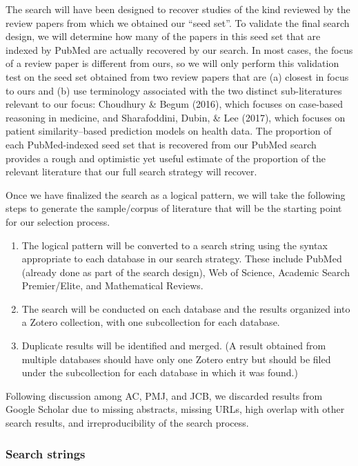 \documentclass[preprint, 3p,
authoryear]{elsarticle} %
\providecommand{\tightlist}{%
  \setlength{\itemsep}{0pt}\setlength{\parskip}{0pt}}
\begin{document}
The search will have been designed to recover studies of the kind
reviewed by the review papers from which we obtained our ``seed set''.
To validate the final search design, we will determine how many of the
papers in this seed set that are indexed by PubMed are actually
recovered by our search. In most cases, the focus of a review paper is
different from ours, so we will only perform this validation test on the
seed set obtained from two review papers that are (a) closest in focus
to ours and (b) use terminology associated with the two distinct
sub-literatures relevant to our focus: Choudhury \& Begum (2016), which
focuses on case-based reasoning in medicine, and Sharafoddini, Dubin, \&
Lee (2017), which focuses on patient similarity--based prediction models
on health data. The proportion of each PubMed-indexed seed set that is
recovered from our PubMed search provides a rough and optimistic yet
useful estimate of the proportion of the relevant literature that our
full search strategy will recover.

Once we have finalized the search as a logical pattern, we will take the
following steps to generate the sample/corpus of literature that will be
the starting point for our selection process.

\begin{enumerate}
\def\labelenumi{\arabic{enumi}.}
\tightlist
\item
  The logical pattern will be converted to a search string using the
  syntax appropriate to each database in our search strategy. These
  include PubMed (already done as part of the search design), Web of
  Science, Academic Search Premier/Elite, and Mathematical Reviews.
\item
  The search will be conducted on each database and the results
  organized into a Zotero collection, with one subcollection for each
  database.
\item
  Duplicate results will be identified and merged. (A result obtained
  from multiple databases should have only one Zotero entry but should
  be filed under the subcollection for each database in which it was
  found.)
\end{enumerate}

Following discussion among AC, PMJ, and JCB, we discarded results from
Google Scholar due to missing abstracts, missing URLs, high overlap with
other search results, and irreproducibility of the search process.

\hypertarget{search-strings}{%
\subsubsection{Search strings}\label{search-strings}}
\end{document}
